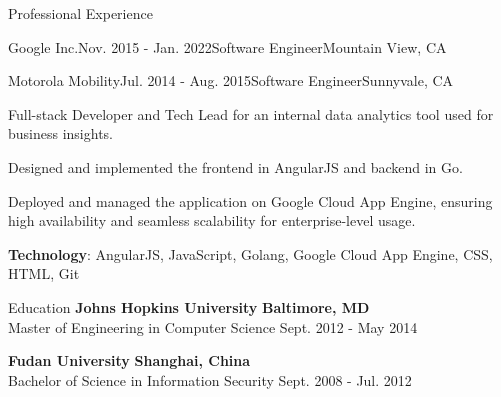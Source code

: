 \documentclass{resume} %
\begin{document}
\begin{rSection}{Professional Experience}
\begin{rSubsection}{Google Inc.}{Nov. 2015 - Jan. 2022}{Software Engineer}{Mountain View, CA}
\end{rSubsection}

\begin{rSubsection}{Motorola Mobility}{Jul. 2014 - Aug. 2015}{Software Engineer}{Sunnyvale, CA}
\item Full-stack Developer and Tech Lead for an internal data analytics tool used for business insights.
\item Designed and implemented the frontend in AngularJS and backend in Go.
\item Deployed and managed the application on Google Cloud App Engine, ensuring high availability and seamless scalability for enterprise-level usage.
\item \textbf{Technology}: AngularJS, JavaScript, Golang, Google Cloud App Engine, CSS, HTML, Git
\end{rSubsection}


\end{rSection}

\begin{rSection}{Education}
{\bf Johns Hopkins University} \hfill {\bf Baltimore, MD} \\
{Master of Engineering in Computer Science} \hfill {Sept. 2012 - May 2014}

{\bf Fudan University} \hfill {\bf Shanghai, China} \\
{Bachelor of Science in Information Security} \hfill {Sept. 2008 - Jul. 2012}
\end{rSection}
\end{document}

